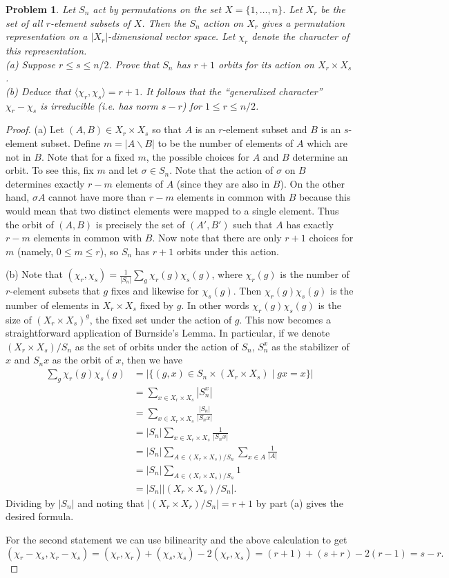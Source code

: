 \documentclass{article}
\newtheorem{problem}{Problem}
\begin{document}
\begin{problem}
Let $S_n$ act by permutations on the set $X = \{1, \dots , n\}$. Let $X_r$ be the set of all $r$-element subsets of $X$. Then the $S_n$ action on $X_r$ gives a permutation representation on a $|X_r|$-dimensional vector space. Let $\chi_r$ denote the character of this representation.\\
(a) Suppose $r \leq s \leq n/2$. Prove that $S_n$ has $r+1$ orbits for its action on $X_r \times X_s$.\\
(b) Deduce that $\langle \chi_r, \chi_s \rangle = r + 1$. It follows that the ``generalized character'' $\chi_r - \chi_s$ is irreducible (i.e. has norm $s-r$) for $1 \leq r \leq n/2$.
\end{problem}
\begin{proof}
(a) Let $(A, B) \in X_r \times X_s$ so that $A$ is an $r$-element subset and $B$ is an $s$-element subset. Define $m = |A \backslash B|$ to be the number of elements of $A$ which are not in $B$. Note that for a fixed $m$, the possible choices for $A$ and $B$ determine an orbit. To see this, fix $m$ and let $\sigma \in S_n$. Note that the action of $\sigma$ on $B$ determines exactly $r-m$ elements of $A$ (since they are also in $B$). On the other hand, $\sigma A$ cannot have more than $r-m$ elements in common with $B$ because this would mean that two distinct elements were mapped to a single element. Thus the orbit of $(A, B)$ is precisely the set of $(A',B')$ such that $A$ has exactly $r-m$ elements in common with $B$. Now note that there are only $r+1$ choices for $m$ (namely, $0 \leq m \leq r$), so $S_n$ has $r+1$ orbits under this action.

(b) Note that $(\chi_r, \chi_s) = \frac{1}{|S_n|} \sum_g \chi_r(g)\chi_s(g)$, where $\chi_r(g)$ is the number of $r$-element subsets that $g$ fixes and likewise for $\chi_s(g)$. Then $\chi_r(g)\chi_s(g)$ is the number of elements in $X_r \times X_s$ fixed by $g$. In other words $\chi_r(g)\chi_s(g)$ is the size of $(X_r \times X_s)^g$, the fixed set under the action of $g$. This now becomes a straightforward application of Burnside's Lemma. In particular, if we denote $(X_r \times X_s)/S_n$ as the set of orbits under the action of $S_n$, $S_n^x$ as the stabilizer of $x$ and $S_nx$ as the orbit of $x$, then we have
\begin{align*}
\sum_{g} \chi_r(g) \chi_s(g)
&= |\{(g,x) \in S_n \times (X_r \times X_s) \mid gx = x\}|\\
&= \sum_{x \in X_r \times X_s} |S_n^x|\\
&= \sum_{x \in X_r \times X_s} \frac{|S_n|}{|S_nx|}\\
&= |S_n| \sum_{x \in X_r \times X_s} \frac{1}{|S_nx|}\\
&= |S_n| \sum_{A \in (X_r \times X_s)/S_n} \sum_{x \in A} \frac{1}{|A|}\\
&= |S_n| \sum_{A \in (X_r \times X_s)/S_n} 1\\
&= |S_n||(X_r \times X_s)/S_n|.
\end{align*}
Dividing by $|S_n|$ and noting that $|(X_r \times X_r)/S_n| = r+1$ by part (a) gives the desired formula.

For the second statement we can use bilinearity and the above calculation to get
\[
(\chi_r - \chi_s, \chi_r - \chi_s) = (\chi_r, \chi_r) + (\chi_s, \chi_s) - 2(\chi_r, \chi_s) = (r+1) + (s+r) - 2(r-1) = s-r.
\]
\end{proof}
\end{document}
